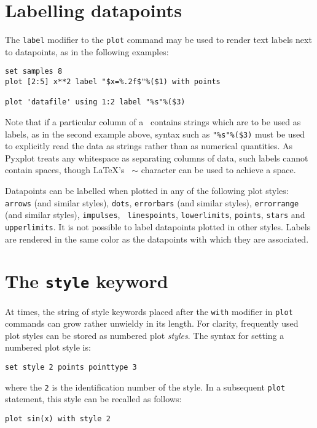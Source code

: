 \section{Labelling datapoints}

The {\tt label} modifier to the {\tt plot} command may be used to render text
labels next to datapoints, as in the following examples:
\begin{verbatim}
set samples 8
plot [2:5] x**2 label "$x=%.2f$"%($1) with points

plot 'datafile' using 1:2 label "%s"%($3)
\end{verbatim}

\noindent Note that if a particular column of a \datafile\ contains strings
which are to be used as labels, as in the second example above, syntax such as
{\tt "\%s"\%(\$3)} must be used to explicitly read the data as strings rather
than as numerical quantities.  As Pyxplot treats any whitespace as separating
columns of data, such labels cannot contain spaces, though \LaTeX's {\tt
$\sim$} character can be used to achieve a space.

Datapoints can be labelled when plotted in any of the following plot styles:
{\tt arrows} (and similar styles), {\tt dots}, {\tt errorbars} (and similar
styles), {\tt errorrange} (and similar styles), {\tt impulses}, {\tt
linespoints}, {\tt lowerlimits}, {\tt points}, {\tt stars} and {\tt
upperlimits}. It is not possible to label datapoints plotted in other styles.
Labels are rendered in the same color as the datapoints with which they are
associated.

\section{The {\tt style} keyword}

At times, the string of style keywords placed after the {\tt with} modifier in
{\tt plot} commands can grow rather unwieldy in its length. For clarity,
frequently used plot styles can be stored as numbered plot {\it styles}.  The
syntax for setting a numbered plot style is:

\begin{verbatim}
set style 2 points pointtype 3
\end{verbatim}

\noindent where the {\tt 2} is the identification number of the style. In a
subsequent {\tt plot} statement, this style can be recalled as follows:

\begin{verbatim}
plot sin(x) with style 2
\end{verbatim}

